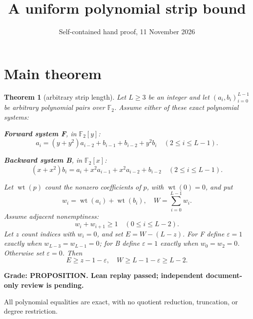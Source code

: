\documentclass{article}
\title{A uniform polynomial strip bound}
\author{}
\date{Self-contained hand proof, 11 November 2026}
\newtheorem*{maintheorem}{Theorem}
\DeclareMathOperator{\wt}{wt}
\begin{document}
\maketitle

\section{Main theorem}\label{sec:main}

\begin{maintheorem}[arbitrary strip length]
  Let \(L\ge3\) be an integer and let \((a_i,b_i)_{i=0}^{L-1}\) be arbitrary polynomial pairs over \(\mathbb{F}_2\). Assume either of these exact polynomial systems:

  \textbf{Forward system F}, in \(\mathbb{F}_2[y]\):
  \begin{equation}\label{eq:forward}
    a_i = (y + y^2) a_{i-2} + b_{i-1} + b_{i-2} + y^2 b_i \quad (2 \le i \le L-1).
  \end{equation}

  \textbf{Backward system B}, in \(\mathbb{F}_2[x]\):
  \begin{equation}\label{eq:backward}
    (x + x^2) b_i = a_i + x^2 a_{i-1} + x^2 a_{i-2} + b_{i-2} \quad (2 \le i \le L-1).
  \end{equation}

  Let \(\wt(p)\) count the nonzero coefficients of \(p\), with \(\wt(0) = 0\), and put
  \begin{equation}
    w_i = \wt(a_i) + \wt(b_i), \quad W = \sum_{i=0}^{L-1} w_i.
  \end{equation}
  Assume adjacent nonemptiness:
  \begin{equation}\label{eq:adjacent}
    w_i + w_{i+1} \ge 1 \quad (0 \le i \le L-2).
  \end{equation}
  Let \(z\) count indices with \(w_i = 0\), and set \(E = W - (L - z)\). For F define
  \(\varepsilon = 1\) exactly when \(w_{L-3} = w_{L-1} = 0\); for B define \(\varepsilon = 1\) exactly
  when \(w_0 = w_2 = 0\). Otherwise set \(\varepsilon = 0\). Then
  \begin{equation}\label{eq:main-bound}
    E \ge z - 1 - \varepsilon, \quad W \ge L-1 - \varepsilon \ge L-2.
  \end{equation}
\end{maintheorem}

\textbf{Grade: PROPOSITION. Lean replay passed; independent document-only review is pending.}

All polynomial equalities are exact, with no quotient reduction, truncation, or degree restriction.
\end{document}
